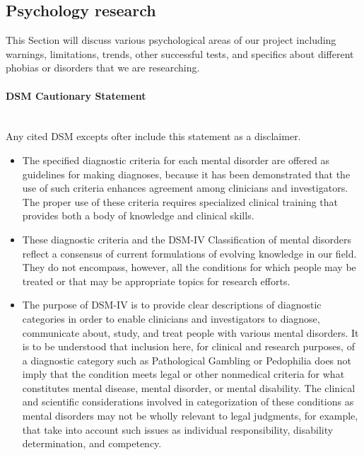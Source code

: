 \documentclass[a4paper,10pt]{article}
\begin{document}
\subsection {Psychology research}
This Section will discuss various psychological areas of our project including warnings, limitations, trends, other successful tests, and specifics about different phobias or disorders 
that we are researching. 

\paragraph{DSM Cautionary Statement}  ~\\
Any cited DSM excepts ofter include this statement as a disclaimer. \cite{dsmCaution}
\begin{itemize}

\item The specified diagnostic criteria for each mental disorder are offered as guidelines for making diagnoses, because it has been demonstrated that 
the use of such criteria enhances agreement among clinicians and investigators. The proper use of these criteria requires specialized clinical
training that provides both a body of knowledge and clinical skills. 

\item These diagnostic criteria and the DSM-IV Classification of mental disorders reflect a consensus of current formulations of evolving knowledge in
our field. They do not encompass, however, all the conditions for which people may be treated or that may be appropriate topics for research efforts. 

\item The purpose of DSM-IV is to provide clear descriptions of diagnostic categories in order to enable clinicians and investigators to diagnose, communicate
about, study, and treat people with various mental disorders. It is to be understood that inclusion here, for clinical and research purposes, of a diagnostic
category such as Pathological Gambling or Pedophilia does not imply that the condition meets legal or other nonmedical criteria for what constitutes mental disease,
mental disorder, or mental disability. The clinical and scientific considerations involved in categorization of these conditions as mental disorders may not be wholly 
relevant to legal judgments, for example, that take into account such issues as individual responsibility, disability determination, and competency.
\end{itemize}
\pagebreak
\end{document}
